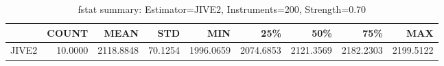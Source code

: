 \begin{table}[ht]
\centering
\caption{fstat summary: Estimator=JIVE2, Instruments=200, Strength=0.70}
\begin{tabular}{lrrrrrrrr}
\toprule
 & COUNT & MEAN & STD & MIN & 25\% & 50\% & 75\% & MAX \\
\midrule
JIVE2 & 10.0000 & 2118.8848 & 70.1254 & 1996.0659 & 2074.6853 & 2121.3569 & 2182.2303 & 2199.5122 \\
\bottomrule
\end{tabular}
\end{table}
